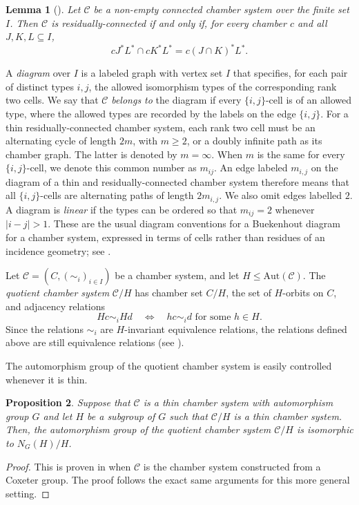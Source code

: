 \documentclass[10pt,a4paper]{amsart}
\newtheorem{prop}{Proposition}[section]
\newtheorem{lemma}[prop]{Lemma}
\newcommand{\CC}{\mathcal{C}}
\newcommand{\Aut}{\mathrm{Aut}}
\newcommand{\C}{\mathcal{C}}
\begin{document}
\begin{lemma}[{\cite[Lemma~3.4.9]{buekenhout2013diagram}}]
\label{lem:rc-characterisation}
Let $\CC$ be a non-empty connected chamber system over the finite set $I$.
Then $\CC$ is residually-connected if and only if, for every chamber $c$ and
all $J,K,L\subseteq I$,
\begin{equation}
\label{eq:rc-cell-identity}
    cJ^*L^*\cap cK^*L^*=c(J\cap K)^*L^*.
\end{equation}
\end{lemma}

A \emph{diagram} over $I$ is a labeled graph with vertex set $I$ that specifies, for each pair of distinct types
$i,j$, the allowed isomorphism types of the corresponding rank two cells.  We say that $\CC$
\emph{belongs to} the diagram if every $\{i,j\}$-cell is of an allowed
type, where the allowed types are recorded by the labels on the edge $\{i,j\}$. For a thin residually-connected chamber system, each rank two cell
must be an alternating cycle of length $2m$, with $m\geq2$, or a doubly infinite
path as its chamber graph.  The latter is denoted by $m=\infty$.  When $m$
is the same for every $\{i,j\}$-cell, we denote this common number as $m_{ij}$. An edge labeled $m_{i,j}$ on the diagram of a thin and residually-connected chamber system therefore means that all $\{i,j\}$-cells are alternating paths of length $2m_{i,j}$. We also omit edges labelled $2$.  A diagram is \emph{linear} if the types can be ordered so that
$m_{ij}=2$ whenever $|i-j|>1$.  These are the usual diagram conventions for a Buekenhout diagram for a chamber system,
expressed in terms of cells rather than residues of an incidence geometry;
see \cite[Sections~3.5 and~4.1]{buekenhout2013diagram}.

Let $\CC=(C,(\sim_i)_{i\in I})$ be a chamber system, and let
$H\leq\Aut(\CC)$.  The \emph{quotient chamber system} $\CC/H$ has chamber set
$C/H$, the set of $H$-orbits on $C$, and adjacency relations
\begin{equation*}
    Hc\sim_i Hd
    \quad\Longleftrightarrow\quad
    hc\sim_i d\text{ for some }h\in H.
\end{equation*}
Since the relations $\sim_i$ are $H$-invariant equivalence relations, the
relations defined above are still
equivalence relations (see \cite[Proposition~3.1.10]{buekenhout2013diagram}).

The automorphism group of the quotient chamber system is easily controlled whenever it is thin.

\begin{prop}\label{prop:AutomorphismGroupQuotient}
    Suppose that $\C$ is a thin chamber system with automorphism group $G$ and let $H$ be a subgroup of $G$ such that $\C/H$ is a thin chamber system. Then, the automorphism group of the quotient chamber system $\C/H$ is isomorphic to $N_G(H)/H$.
\end{prop}
\begin{proof}
    This is proven in \cite[Proposition 4.2.10]{buekenhout2013diagram} when $\C$ is the chamber system constructed from a Coxeter group. The proof follows the exact same arguments for this more general setting.
\end{proof}
\end{document}
